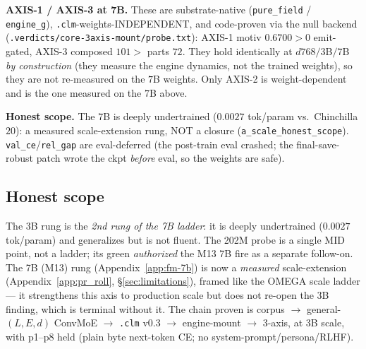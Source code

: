 \textbf{AXIS-1 / AXIS-3 at 7B.} These are substrate-native (\texttt{pure\_field} /
\texttt{engine\_g}), \texttt{.clm}-weights-INDEPENDENT, and code-proven via the null backend
(\texttt{.verdicts/core-3axis-mount/probe.txt}): AXIS-1 motiv $0.6700>0$ emit-gated, AXIS-3
composed $101>$ parts $72$. They hold identically at $d768/3$B$/7$B \emph{by construction} (they
measure the engine dynamics, not the trained weights), so they are not re-measured on the $7$B
weights. Only AXIS-2 is weight-dependent and is the one measured on the $7$B above.

\textbf{Honest scope.} The $7$B is deeply undertrained ($0.0027$ tok/param vs.\ Chinchilla
$20$): a measured scale-extension rung, NOT a closure (\texttt{a\_scale\_honest\_scope}).
\texttt{val\_ce}/\texttt{rel\_gap} are eval-deferred (the post-train eval crashed; the
final-save-robust patch wrote the ckpt \emph{before} eval, so the weights are safe).

\subsection{Honest scope}
\label{app:fm-scope}

The 3B rung is the \emph{2nd rung of the 7B ladder}: it is
deeply undertrained ($0.0027$ tok/param) and generalizes but is not fluent. The
202M probe is a single MID point, not a ladder; its green \emph{authorized} the
M13 7B fire as a separate follow-on. The 7B (M13) rung
(Appendix~\ref{app:fm-7b}) is now a \emph{measured} scale-extension
(Appendix~\ref{app:pr_roll}, \S\ref{sec:limitations}),
framed like the OMEGA scale ladder --- it strengthens this axis to production
scale but does not re-open the 3B finding, which is terminal without it. The
chain proven is corpus $\rightarrow$ general-$(L,E,d)$ ConvMoE $\rightarrow$
\texttt{.clm} v0.3 $\rightarrow$ engine-mount $\rightarrow$ 3-axis, at 3B scale,
with p1--p8 held (plain byte next-token CE; no system-prompt/persona/RLHF).
